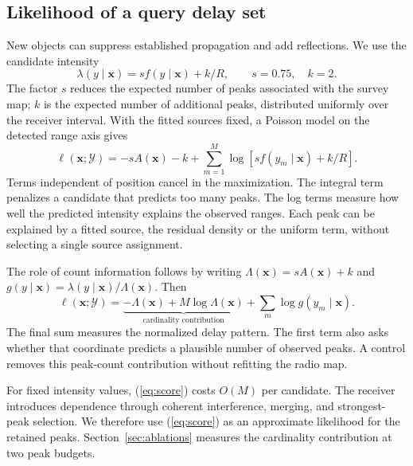 \documentclass[conference]{IEEEtran}
\newcommand{\Y}{\mathcal Y}
\begin{document}
\subsection{Likelihood of a query delay set}
New objects can suppress established propagation and add reflections. We use the candidate intensity
\begin{equation}
\lambda(y\mid\bm x)=s f(y\mid\bm x)+k/R,\qquad
s=0.75,\quad k=2.
\label{eq:intensity}
\end{equation}
The factor \(s\) reduces the expected number of peaks associated with the survey map; \(k\) is the expected number of additional peaks, distributed uniformly over the receiver interval. With the fitted sources fixed, a Poisson model on the detected range axis \cite{mahler2007fisst,george2016pointprocess} gives
\begin{equation}
\ell(\bm x;\Y)=-sA(\bm x)-k+
\sum_{m=1}^M\log\left[s f(y_m\mid\bm x)+k/R\right].
\label{eq:score}
\end{equation}
Terms independent of position cancel in the maximization. The integral term penalizes a candidate that predicts too many peaks. The log terms measure how well the predicted intensity explains the observed ranges. Each peak can be explained by a fitted source, the residual density or the uniform term, without selecting a single source assignment.

The role of count information follows by writing \(\Lambda(\bm x)=sA(\bm x)+k\) and \(g(y\mid\bm x)=\lambda(y\mid\bm x)/\Lambda(\bm x)\). Then
\begin{equation}
\ell(\bm x;\Y)=\underbrace{-\Lambda(\bm x)+M\log\Lambda(\bm x)}_{\text{cardinality contribution}}
+\sum_m\log g(y_m\mid\bm x).
\label{eq:count}
\end{equation}
The final sum measures the normalized delay pattern. The first term also asks whether that coordinate predicts a plausible number of observed peaks. A control removes this peak-count contribution without refitting the radio map.

For fixed intensity values, (\ref{eq:score}) costs \(O(M)\) per candidate. The receiver introduces dependence through coherent interference, merging, and strongest-peak selection. We therefore use (\ref{eq:score}) as an approximate likelihood for the retained peaks. Section~\ref{sec:ablations} measures the cardinality contribution at two peak budgets.
\end{document}
